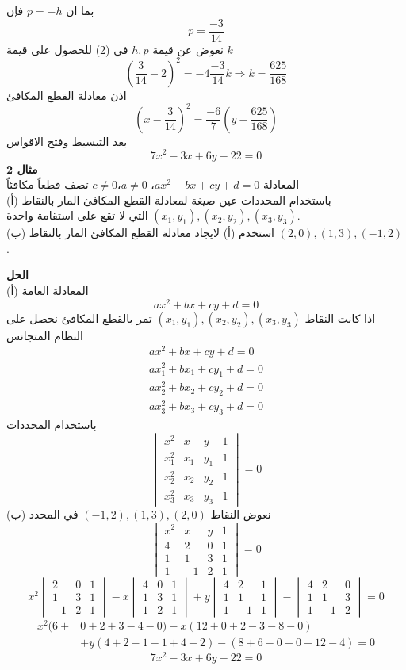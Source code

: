 بما ان $p = -h$ فإن 
\[
\boxed{p = \frac{-3}{14}}
\]
نعوض عن قيمة $h,p$ في (2) للحصول على قيمة $k$
\[
\left(\frac{3}{14} - 2\right)^2 = - 4 \frac{-3}{14} k \Rightarrow \boxed{k = \frac{625}{168}}
\]
اذن معادلة القطع المكافئ
\[
\left(x- \frac{3}{14}\right)^2 = \frac{-6}{7} \left(y - \frac{625}{168}\right)
\]
بعد التبسيط وفتح الاقواس
\[
7x^2 - 3x + 6y - 22=0
\]
\noindent
\textbf{مثال 2}\\
\noindent
المعادلة $ax^2+bx+cy+d=0$، $a\neq0$،$c\neq0$ تصف قطعاً مكافئاً\\
	(أ) باستخدام المحددات عين صيغة لمعادلة القطع المكافئ المار بالنقاط $(x_1, y_1) , (x_2, y_2) , (x_3, y_3)$ التي لا تقع على استقامة واحدة.\\
(ب) استخدم (أ) لايجاد معادلة القطع المكافئ المار بالنقاط 
	$(2, 0), (1, 3), (-1,2)$.

\noindent
\textbf{الحل}\\
\noindent
(أ) المعادلة العامة 
\[
ax^2+bx+cy+d=0
\]
اذا كانت النقاط $(x_1,y_1),(x_2,y_2),(x_3,y_3)$ تمر بالقطع المكافئ نحصل على النظام المتجانس
\begin{align*}
	ax^2+bx+cy+d=0\\
	ax_1^2+bx_1+cy_1+d=0\\
	ax_2^2+bx_2+cy_2+d=0\\
	ax_3^2+bx_3+cy_3+d=0
\end{align*}
باستخدام المحددات
\[
\begin{vmatrix}
	x^2  & x & y & 1\\
	x_1^2  & x_1 & y_1 & 1\\
	x_2^2  & x_2 & y_2 & 1\\
	x_3^2  & x_3 & y_3 & 1
\end{vmatrix} = 0
\]
(ب) نعوض النقاط 
$(-1,2), (1,3), (2,0)$
في المحدد
\[
\begin{vmatrix}
	x^2 & x& y& 1\\
	4 & 2 & 0 & 1\\
	1 & 1& 3 & 1\\
	1 & -1 & 2&1
\end{vmatrix} = 0
\]
\[
x^2\begin{vmatrix}
	2 & 0&1\\
	1&3&1\\
	-1&2&1
\end{vmatrix}
-x \begin{vmatrix}
	4&0&1\\
	1&3&1\\
	1&2&1
\end{vmatrix}
+ y\begin{vmatrix}
	4&2&1\\
	1&1&1\\
	1&-1&1
\end{vmatrix}
-\begin{vmatrix}
	4&2&0\\
	1&1&3\\
	1&-1&2
\end{vmatrix} = 0
\]
\begin{align*}
	x^2(6+&0+2+3-4-0) - x(12+0+2-3-8-0)\\
	&+ y (4+2-1-1+4-2) - (8+6-0-0+12-4) = 0
\end{align*}
\[
7x^2 - 3x + 6y - 22=0
\]